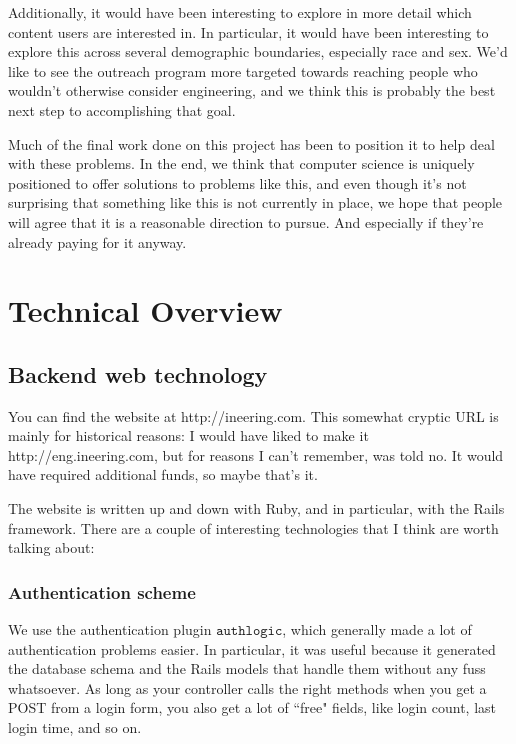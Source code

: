 \documentclass[11pt,a4paper]{article}
\begin{document}
Additionally, it would have been interesting to explore in more detail which content users are interested in. In particular, it would have been interesting to explore this across several demographic boundaries, especially race and sex. We'd like to see the outreach program more targeted towards reaching people who wouldn't otherwise consider engineering, and we think this is probably the best next step to accomplishing that goal.

Much of the final work done on this project has been to position it to help deal with these problems. In the end, we think that computer science is uniquely positioned to offer solutions to problems like this, and even though it's not surprising that something like this is not currently in place, we hope that people will agree that it is a reasonable direction to pursue. And especially if they're already paying for it anyway.

\section{Technical Overview}

\subsection{Backend web technology}

You can find the website at http://ineering.com. This somewhat cryptic URL is mainly for historical reasons: I would have liked to make it http://eng.ineering.com, but for reasons I can't remember, was told no. It would have required additional funds, so maybe that's it.

The website is written up and down with Ruby, and in particular, with the Rails framework. There are a couple of interesting technologies that I think are worth talking about:

\subsubsection{Authentication scheme}

We use the authentication plugin $\texttt{authlogic}$, which generally made a lot of authentication problems easier. In particular, it was useful because it generated the database schema and the Rails models that handle them without any fuss whatsoever. As long as your controller calls the right methods when you get a POST from a login form, you also get a lot of ``free" fields, like login count, last login time, and so on.
\end{document}

